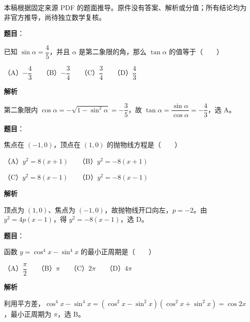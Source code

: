

\begin{gktip}
本稿根据固定来源 PDF 的题面推导。原件没有答案、解析或分值；所有结论均为非官方推导，尚待独立数学复核。
\end{gktip}

\begin{answer}

\textbf{题目}：

已知 $\sin\alpha=\dfrac45$，并且 $\alpha$ 是第二象限的角，那么 $\tan\alpha$ 的值等于\mbox{（　　）}

（A）$-\dfrac43$　　（B）$-\dfrac34$　　（C）$\dfrac34$　　（D）$\dfrac43$

\textbf{解析}

第二象限内 $\cos\alpha=-\sqrt{1-\sin^2\alpha}=-\dfrac35$，故 $\tan\alpha=\dfrac{\sin\alpha}{\cos\alpha}=-\dfrac43$，选 A。


\end{answer}
\begin{answer}

\textbf{题目}：

焦点在 $(-1,0)$，顶点在 $(1,0)$ 的抛物线方程是\mbox{（　　）}

（A）$y^2=8(x+1)$　　（B）$y^2=-8(x+1)$

（C）$y^2=8(x-1)$　　（D）$y^2=-8(x-1)$

\textbf{解析}

顶点为 $(1,0)$、焦点为 $(-1,0)$，故抛物线开口向左，$p=-2$。由 $y^2=4p(x-1)$，得 $y^2=-8(x-1)$，选 D。


\end{answer}
\begin{answer}

\textbf{题目}：

函数 $y=\cos^4x-\sin^4x$ 的最小正周期是\mbox{（　　）}

（A）$\dfrac\pi2$　　（B）$\pi$　　（C）$2\pi$　　（D）$4\pi$

\textbf{解析}

利用平方差，$\cos^4x-\sin^4x=(\cos^2x-\sin^2x)(\cos^2x+\sin^2x)=\cos2x$，最小正周期为 $\pi$，选 B。


\end{answer}
